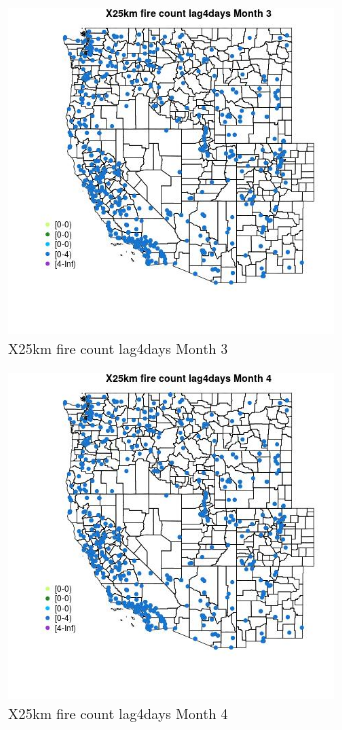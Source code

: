 \begin{figure} 
\centering  
\includegraphics[width=0.77\textwidth]{Code_Outputs/Report_ML_input_PM25_Step4_part_e_de_duplicated_aves_compiled_2019-05-14wNAs_MapObsMo3X25km_fire_count_lag4days.jpg} 
\caption{\label{fig:Report_ML_input_PM25_Step4_part_e_de_duplicated_aves_compiled_2019-05-14wNAsMapObsMo3X25km_fire_count_lag4days}X25km fire count lag4days Month 3} 
\end{figure} 
 

\clearpage 

\begin{figure} 
\centering  
\includegraphics[width=0.77\textwidth]{Code_Outputs/Report_ML_input_PM25_Step4_part_e_de_duplicated_aves_compiled_2019-05-14wNAs_MapObsMo4X25km_fire_count_lag4days.jpg} 
\caption{\label{fig:Report_ML_input_PM25_Step4_part_e_de_duplicated_aves_compiled_2019-05-14wNAsMapObsMo4X25km_fire_count_lag4days}X25km fire count lag4days Month 4} 
\end{figure} 
 

